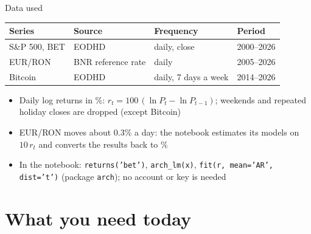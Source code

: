 \begin{frame}{Data used}
\itemsize{\small}
\begin{center}
\footnotesize
\begin{tabular}{llll}
\toprule
\textbf{Series} & \textbf{Source} & \textbf{Frequency} & \textbf{Period} \\
\midrule
S\&P 500, BET & EODHD & daily, close & 2000--2026 \\
EUR/RON & BNR reference rate & daily & 2005--2026 \\
Bitcoin & EODHD & daily, 7 days a week & 2014--2026 \\
\bottomrule
\end{tabular}
\end{center}
\begin{itemize}
    \item Daily log returns in \%: $r_t = 100\,(\ln P_t - \ln P_{t-1})$; weekends and repeated holiday closes are dropped (except Bitcoin)
    \item EUR/RON moves about 0.3\% a day: the notebook estimates its models on $10\,r_t$ and converts the results back to \%
    \item In the notebook: \texttt{returns('bet')}, \texttt{arch\_lm(x)}, \texttt{fit(r, mean='AR', dist='t')} (package \texttt{arch}); no account or key is needed
\end{itemize}
\end{frame}


\section{What you need today}

